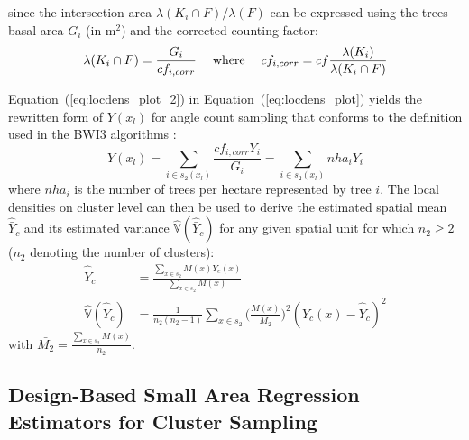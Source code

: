 \documentclass[remotesensing,article,accept,moreauthors,pdftex,10pt,a4paper]{Definitions/mdpi}
\newcommand{\var}{\mathbb{V}}
\begin{document}
since the intersection area $\lambda(K_i \cap F)/\lambda(F)$ can be expressed using the trees basal area $G_i$ (in m$^2$) and the corrected counting factor:
\begin{equation}\label{eq:locdens_plot_3}
\lambda(K_i \cap F)  =  \frac{G_i}{cf_{i, corr}} \hspace{3ex} \text{where} \hspace{3ex} cf_{i,corr}  =  cf\frac{\lambda(K_i)}{\lambda(K_i \cap F)}
\end{equation}

Equation~(\ref{eq:locdens_plot_2}) in Equation~(\ref{eq:locdens_plot}) yields the rewritten form of $Y(x_l)$ for angle count sampling that conforms to the definition used in the BWI3 algorithms \citep{bwi3_ausw}:
\begin{equation}\label{eq:locdens_plot_4}
Y(x_l) =  \sum_{i \in s_{2}(x_l)} \frac{cf_{i, corr}Y_i}{G_i}  =  \sum_{i \in s_{2}(x_l)} nha_{i}{Y_i}
\end{equation}
where $nha_i$ is the number of trees per hectare represented by tree $i$. The local densities on cluster level can then be used to derive the estimated spatial mean $\hat{\bar{Y}}_c$ and its estimated variance $\hat{\var}(\hat{\bar{Y}}_c)$ for any given spatial unit for which $n_2 \geq 2$ ($n_2$ denoting the number of clusters):
\begin{subequations}\label{eq:srs_est_clusters}
	\begin{align}
	\hat{\bar{Y}}_c & =  \frac{\sum_{x \in s_2} M(x) Y_{c}(x)}{\sum_{x \in s_2} M(x)} \\
	\hat{\var}(\hat{\bar{Y}}_c) & =  \frac{1}{n_2(n_2 - 1)}\sum_{x \in s_2}\Big(\frac{M(x)}{\bar{M_2}}\Big)^2(Y_{c}(x) - \hat{\bar{Y}}_c)^2
	\end{align}
\end{subequations}
with $\bar{M_2} = \frac{\sum_{x \in s_{2}}M(x)}{n_{2}}$.


\subsection{Design-Based Small Area Regression Estimators for Cluster Sampling}
\label{sec:SAestimators}
\end{document}
